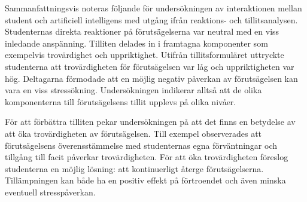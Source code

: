 Sammanfattningsvis noteras följande för undersökningen av interaktionen mellan student och artificiell intelligens med utgång ifrån reaktions- och tillitsanalysen. Studenternas direkta reaktioner på förutsägelserna var neutral med en viss inledande anspänning. Tilliten delades in i framtagna komponenter som exempelvis trovärdighet och uppriktighet. Utifrån tillitsformuläret uttryckte studenterna att trovärdigheten för förutsägelsen var låg och uppriktigheten var hög. Deltagarna förmodade att en möjlig negativ påverkan av förutsägelsen kan vara en viss stressökning. Undersökningen indikerar alltså att de olika komponenterna till förutsägelsens tillit upplevs på olika nivåer. 

För att förbättra tilliten pekar undersökningen på att det finns en betydelse av att öka trovärdigheten av förutsägelsen. Till exempel observerades att förutsägelsens överensstämmelse med studenternas egna förväntningar och tillgång till facit påverkar trovärdigheten. För att öka trovärdigheten föreslog studenterna en möjlig lösning: att kontinuerligt återge förutsägelserna. Tillämpningen kan både ha en positiv effekt på förtroendet och även minska eventuell stresspåverkan.




